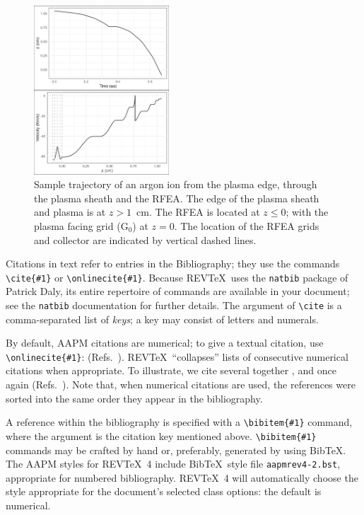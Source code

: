 \documentclass[%
 aapm,
 mph,%
 amsmath,amssymb,
 reprint,%
]{revtex4-2}
\begin{document}
\begin{figure}[htbp]
    \centering
    \includegraphics[width=0.45\textwidth]{Figures/ionTrajectory2Pa13.56MHz2kVStack2332.jpeg}
    \caption{Sample trajectory of an argon ion from the plasma edge, through the plasma sheath and the RFEA. The edge of the plasma sheath and plasma is at $z>1$~cm. The RFEA is located at $z\le0$; with the plasma facing grid (G$_0$) at $z=0$. The location of the RFEA grids and collector are indicated by vertical dashed lines.}
    \label{fig:your_label}
\end{figure}





Citations in text refer to entries in the Bibliography;
they use the commands \verb+\cite{#1}+ or \verb+\onlinecite{#1}+. 
Because REV\TeX\ uses the \verb+natbib+ package of Patrick Daly, 
its entire repertoire of commands are available in your document;
see the \verb+natbib+ documentation for further details.
The argument of \verb+\cite+ is a comma-separated list of \emph{keys};
a key may consist of letters and numerals. 

By default, AAPM citations are numerical; \cite{feyn54} 
to give a textual citation, use \verb+\onlinecite{#1}+: (Refs.~). 
REV\TeX\ ``collapses'' lists of consecutive numerical citations when appropriate. 
To illustrate, we cite several together \cite{feyn54,witten2001,epr,Berman1983}, 
and once again (Refs.~). 
Note that, when numerical citations are used, the references were sorted into the same order they appear in the bibliography. 

A reference within the bibliography is specified with a \verb+\bibitem{#1}+ command,
where the argument is the citation key mentioned above. 
\verb+\bibitem{#1}+ commands may be crafted by hand or, preferably,
generated by using Bib\TeX. 
The AAPM styles for REV\TeX~4 include Bib\TeX\ style file
\verb+aapmrev4-2.bst+, appropriate for
numbered bibliography. 
REV\TeX~4 will automatically choose the style appropriate for 
the document's selected class options: the default is numerical.
\end{document}
